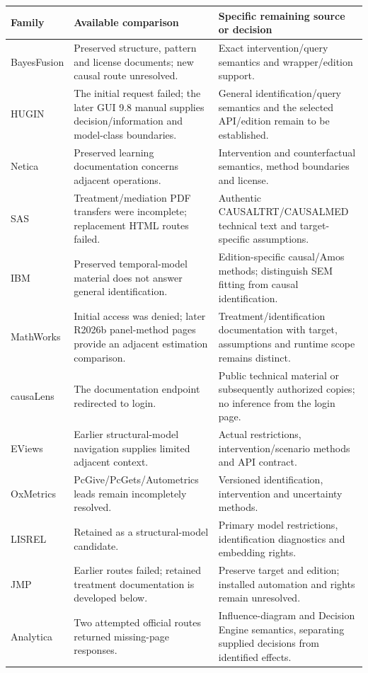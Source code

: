 \begin{longtable}{P{0.17\textwidth}P{0.34\textwidth}P{0.39\textwidth}}
\toprule
Family & Available comparison & Specific remaining source or decision \\
\midrule
\endhead
BayesFusion & Preserved structure, pattern and license documents; new causal route unresolved. & Exact intervention/query semantics and wrapper/edition support. \\
HUGIN & The initial request failed; the later GUI 9.8 manual supplies decision/information and model-class boundaries. & General identification/query semantics and the selected API/edition remain to be established. \\
Netica & Preserved learning documentation concerns adjacent operations. & Intervention and counterfactual semantics, method boundaries and license. \\
SAS & Treatment/mediation PDF transfers were incomplete; replacement HTML routes failed. & Authentic CAUSALTRT/CAUSALMED technical text and target-specific assumptions. \\
IBM & Preserved temporal-model material does not answer general identification. & Edition-specific causal/Amos methods; distinguish SEM fitting from causal identification. \\
MathWorks & Initial access was denied; later R2026b panel-method pages provide an adjacent estimation comparison. & Treatment/identification documentation with target, assumptions and runtime scope remains distinct. \\
causaLens & The documentation endpoint redirected to login. & Public technical material or subsequently authorized copies; no inference from the login page. \\
EViews & Earlier structural-model navigation supplies limited adjacent context. & Actual restrictions, intervention/scenario methods and API contract. \\
OxMetrics & PcGive/PcGets/Autometrics leads remain incompletely resolved. & Versioned identification, intervention and uncertainty methods. \\
LISREL & Retained as a structural-model candidate. & Primary model restrictions, identification diagnostics and embedding rights. \\
JMP & Earlier routes failed; retained treatment documentation is developed below. & Preserve target and edition; installed automation and rights remain unresolved. \\
Analytica & Two attempted official routes returned missing-page responses. & Influence-diagram and Decision Engine semantics, separating supplied decisions from identified effects. \\
\bottomrule
\end{longtable}


